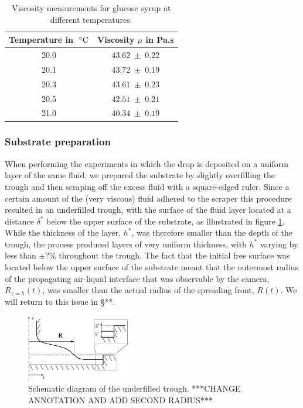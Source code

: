 \documentclass[aip,graphicx]{revtex4-1}
\begin{document}
{\renewcommand{\arraystretch}{1.2}
 \begin{table}[!ht]
 \begin{center}
 \begin{tabular}{c | c}
  Temperature in $\; ^{\circ} \text{C}$ & Viscosity $\mu$ in Pa.s \\ \hline 20.0 &
  $43.62 \; \pm \; 0.22$ \\ 20.1 & $43.72 \; \pm \; 0.19$ \\ 20.3 &
  $43.61 \; \pm \; 0.23$ \\ 20.5 & $42.51 \; \pm \; 0.21$ \\ 21.0 &
  $40.34 \; \pm \; 0.19$\\
 \end{tabular}
 \caption{Viscosity measurements for glucose syrup at different
   temperatures.}
 \label{tab:glucose_viscosity}
 \end{center}
 \end{table}}


\subsubsection{Substrate preparation\label{sec:creating_layer}}
When performing the experiments in which the drop is 
deposited on a uniform layer of the same fluid, we prepared the
substrate by slightly overfilling the trough and then scraping
off the excess fluid with a 
square-edged ruler. Since a certain amount of the (very viscous) fluid 
adhered to the scraper this procedure resulted in an underfilled trough, 
with the surface of the fluid layer located at a distance $\delta^*$ 
below the upper surface of the substrate, as illustrated in figure 
\ref{fig:axisym_drop_nozzle_gap}. While the thickness of the layer, 
$h^*$, was therefore smaller than the depth of the trough, the
process produced layers of very uniform thickness, with
$h^*$ varying by less than {\bf $\pm ?\%$} throughout the trough. 
The fact that the initial free surface was located below the
upper surface of the substrate meant that the outermost radius
of the propagating air-liquid interface that was observable by the camera,
$R_{z=h}(t)$, was smaller than the actual radius of the spreading front,
 $R(t)$. We will return to this issue in \S ***.

\begin{figure}[!ht]
\centering
\includegraphics[width=0.4\textwidth]{figures/axisym_drop_nozzle_gap.eps}
\caption{Schematic diagram of the underfilled trough. ***CHANGE
  ANNOTATION AND ADD SECOND RADIUS***}
\label{fig:axisym_drop_nozzle_gap}
\end{figure}
 
\end{document}
